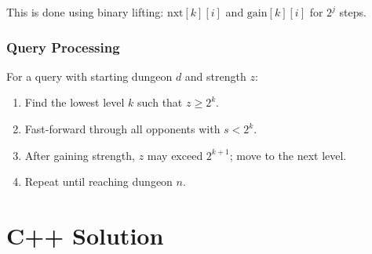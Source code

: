 \documentclass[11pt,a4paper]{article}
\begin{document}
This is done using binary lifting: $\text{nxt}[k][i]$ and $\text{gain}[k][i]$ for $2^j$ steps.

\subsubsection{Query Processing}
For a query with starting dungeon $d$ and strength $z$:
\begin{enumerate}
  \item Find the lowest level $k$ such that $z \ge 2^k$.
  \item Fast-forward through all opponents with $s < 2^k$.
  \item After gaining strength, $z$ may exceed $2^{k+1}$; move to the next level.
  \item Repeat until reaching dungeon $n$.
\end{enumerate}

\section{C++ Solution}
\end{document}
